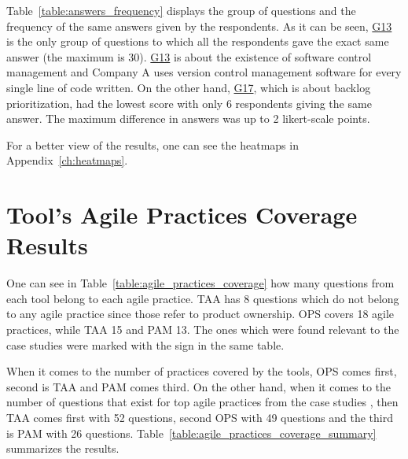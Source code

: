 Table~\ref{table:answers_frequency} displays the group of questions and the frequency of the same answers given by the respondents. As it can be seen, \hyperref[G13]{G13} is the only group of questions to which all the respondents gave the exact same answer (the maximum is 30). \hyperref[G13]{G13} is about the existence of software control management and Company A uses version control management software for every single line of code written. On the other hand, \hyperref[G17]{G17}, which is about backlog prioritization, had the lowest score with only 6 respondents giving the same answer. The maximum difference in answers was up to 2 likert-scale points.

For a better view of the results, one can see the heatmaps in Appendix~\ref{ch:heatmaps}.

\section{Tool's Agile Practices Coverage Results}
\label{sec:coverage_results}
One can see in Table~\ref{table:agile_practices_coverage} how many questions from each tool belong to each agile practice. \ac{TAA} has 8 questions which do not belong to any agile practice since those refer to product ownership. \ac{OPS} covers 18 agile practices, while \ac{TAA} 15 and \ac{PAM} 13. The ones which were found relevant to the case studies \cite{Williams_Microsoft, laurie_williams} were marked with the sign \CrossMaltese in the same table.

When it comes to the number of practices covered by the tools, \ac{OPS} comes first, second is \ac{TAA} and \ac{PAM} comes third. On the other hand, when it comes to the number of questions that exist for top agile practices from the case studies \cite{Williams_Microsoft, laurie_williams}, then \ac{TAA} comes first with 52 questions, second \ac{OPS} with 49 questions and the third is \ac{PAM} with 26 questions. Table~\ref{table:agile_practices_coverage_summary} summarizes the results.

